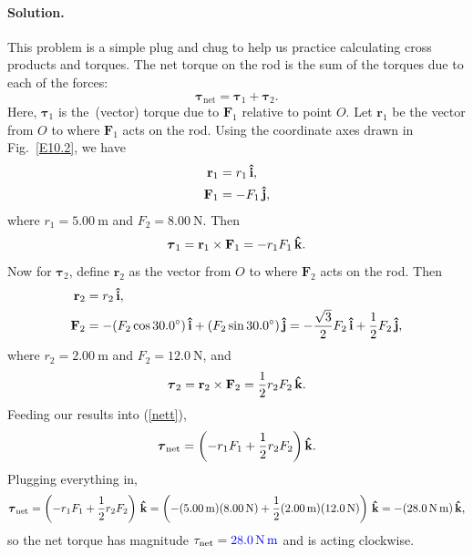 \documentclass[11pt]{article}
\newcommand{\refeq}[1]{(\ref{#1})}
\newcommand{\beq}{\begin{equation*}}
\newcommand{\eeq}{\end{equation*}}
\newcommand{\beqn}{\begin{equation}}
\newcommand{\eeqn}{\end{equation}}
\newenvironment{solution}
{
    \paragraph{Solution.}
    \ignorespaces
}
{
    \bigskip
}
\renewcommand{\vec}[1]{\mathbf{#1}}
\begin{document}
\newcommand{\vF}{\vec{F}}
\newcommand{\vt}{\boldsymbol{\tau}}
\newcommand{\vr}{\vec{r}}

\newcommand{\vFq}{\vF_1}
\newcommand{\Fq}{F_1}
\newcommand{\vFw}{\vF_2}
\newcommand{\Fw}{F_2}

\newcommand{\vtq}{\vt_1}
\newcommand{\vtw}{\vt_2}
\newcommand{\vrq}{\vr_1}
\newcommand{\rrq}{r_1}
\newcommand{\vrw}{\vr_2}
\newcommand{\rw}{r_2}

\newcommand{\vtnet}{\vt_\text{net}}
\newcommand{\tnet}{\tau_\text{net}}


\begin{solution}
	This problem is a simple plug and chug to help us practice calculating cross products and torques.  The net torque on the rod is the sum of the torques due to each of the forces:
	\beqn \label{nett}
		\vtnet = \vtq + \vtw.
	\eeqn
	Here, $\vtq$ is the~(vector) torque due to $\vFq$ relative to point $O$.  Let $\vrq$ be the vector from $O$ to where $\vFq$ acts on the rod.  Using the coordinate axes drawn in Fig.~\ref{E10.2}, we have
	\begin{align*}
		\vrq &= \rrq \ih, \\
		\vFq &= -\Fq \jh,
	\end{align*}
	where $\rrq = \SI{5.00}{\meter}$ and $\Fw = \SI{8.00}{\newton}$.  Then
	\beq
		\vtq = \vrq \times \vFq = -\rrq \Fq \kh.
	\eeq
	Now for $\vtw$, define $\vrw$ as the vector from $O$ to where $\vFw$ acts on the rod.  Then
		\begin{align*}
		\vrw &= \rw \ih, \\
		\vFw &= -(\Fw \cos{30.0^\circ}) \ih + (\Fw \sin{30.0^\circ}) \jh = -\frac{\sqrt{3}}{2} \Fw \ih + \frac{1}{2} \Fw \jh,
	\end{align*}
	where $\rw = \SI{2.00}{\meter}$ and $\Fw = \SI{12.0}{\newton}$, and
	\beq
		\vtw = \vrw \times \vFw = \frac{1}{2} \rw \Fw \kh.
	\eeq
	Feeding our results into \refeq{nett},
	\beq
		\vtnet = \left( -\rrq \Fq + \frac{1}{2} \rw \Fw \right)\!\kh.
	\eeq
	Plugging everything in,
	\beq
		\vtnet = \left( -\rrq \Fq + \frac{1}{2} \rw \Fw \right) \kh = \left( -(\SI{5.00}{\meter}) (\SI{8.00}{\newton}) + \frac{1}{2} (\SI{2.00}{\meter}) (\SI{12.0}{\newton}) \right) \kh = -(\SI{28.0}{\newton\meter}) \kh,
	\eeq
	so the net torque has magnitude $\tnet = {\color{blue} \SI{28.0}{\newton\meter}}$ and is acting {\color{blue} clockwise}.
\end{solution}

\newcommand{\mb}{m_b}
\newcommand{\mw}{m_w}
\newcommand{\mmp}{m_p}

\newcommand{\simb}{\SI{12.0}{\kg} }
\newcommand{\simw}{\SI{5.00}{\kg} }
\newcommand{\simp}{\SI{2.00}{\kg} }
\newcommand{\sIip}{\SI{0.0625}{\kg\square\meter} }
\end{document}
